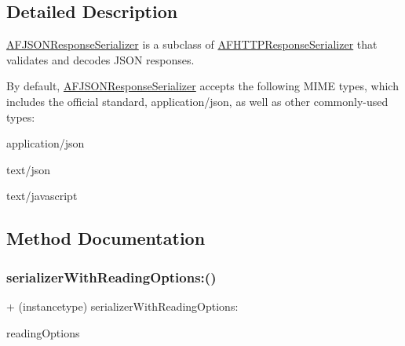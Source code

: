 \subsection{Detailed Description}
{\ttfamily \mbox{\hyperlink{interface_a_f_j_s_o_n_response_serializer}{A\+F\+J\+S\+O\+N\+Response\+Serializer}}} is a subclass of {\ttfamily \mbox{\hyperlink{interface_a_f_h_t_t_p_response_serializer}{A\+F\+H\+T\+T\+P\+Response\+Serializer}}} that validates and decodes J\+S\+ON responses.

By default, {\ttfamily \mbox{\hyperlink{interface_a_f_j_s_o_n_response_serializer}{A\+F\+J\+S\+O\+N\+Response\+Serializer}}} accepts the following M\+I\+ME types, which includes the official standard, {\ttfamily application/json}, as well as other commonly-\/used types\+:


\begin{DoxyItemize}
\item {\ttfamily application/json}
\item {\ttfamily text/json}
\item {\ttfamily text/javascript} 
\end{DoxyItemize}

\subsection{Method Documentation}
\mbox{\label{interface_a_f_j_s_o_n_response_serializer_a84c05ae2bc646684aa9cb39041687979}} 
\subsubsection{\texorpdfstring{serializer\+With\+Reading\+Options\+:()}{serializerWithReadingOptions:()}\hspace{0.1cm}{\footnotesize\ttfamily [1/3]}}
{\footnotesize\ttfamily + (instancetype) serializer\+With\+Reading\+Options\+: \begin{DoxyParamCaption}\item[{(N\+S\+J\+S\+O\+N\+Reading\+Options)}]{reading\+Options }\end{DoxyParamCaption}}


